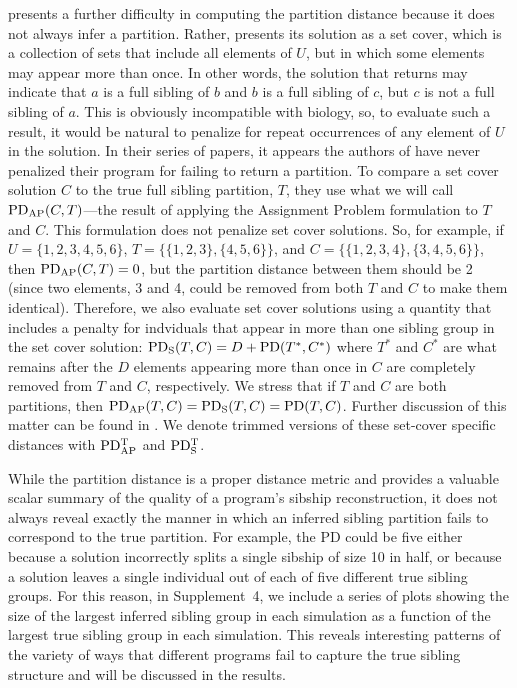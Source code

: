 \kinalyzer{} presents a further difficulty in computing the partition distance because it does not always 
infer a partition.  Rather, \kinalyzer{} presents its solution as a set cover, which is a collection of 
sets that include all elements of $U$, but in which some elements may appear more than once.  In other 
words, the solution that \kinalyzer{} returns may indicate that $a$ is a full sibling of $b$ and $b$ is a 
full sibling of $c$, but $c$ is not a full sibling of $a$.  This is obviously incompatible with
biology, so, to evaluate such a result, it would be natural to penalize for repeat 
occurrences of any element of $U$ in the solution.  In their series of papers, it appears 
the authors of \kinalyzer{} have never penalized their program for failing to return a partition.  To 
compare a set cover solution $C$ to the true full sibling partition, $T$, they use what we will call $
\mathrm{PD_{AP}}(C,T)$---the result of applying the Assignment Problem formulation to $T$ and $C$.     This 
formulation does not penalize set cover solutions.  So, for example, if  $U=\{1,2,3,4,5,6\}$,
$T=\{\{1,2,3\},\{4,5,6\}\}$, and $C=\{\{1,2,3,4\}, \{3,4,5,6\}\}$, then $\mathrm{PD_{AP}}(C,T)=0$, but the partition 
distance between them should be 2 (since two elements, 3 and 4, could be removed from both $T$ and $C$ 
to make them identical).    Therefore, we also evaluate set cover solutions using a quantity that 
includes a penalty for indviduals that appear in more than one sibling group in the set cover solution: 
$\mathrm{PD_S}(T,C)= D+\mathrm{PD}(T^*,C^*)$ where $T^*$ and $C^*$ are what remains after the $D$ elements appearing 
more than once in $C$ are completely removed from $T$ and $C$, respectively.  We stress that if $T$ and $C$ are both 
partitions, then $\mathrm{PD_{AP}}(T,C) = \mathrm{PD_S}(T,C)=\mathrm{PD}(T,C)$. 
Further discussion of this matter can be found in \citet{almudevar11}. 
We denote trimmed versions of these set-cover specific distances with $\mathrm{PD_{AP}^T}$ and $\mathrm{PD_S^T}$.

While the partition distance is a proper distance metric and provides a valuable scalar summary of the 
quality of a program's sibship reconstruction, it does not always reveal exactly the manner in which an 
inferred sibling  partition fails to correspond to the true partition.  For example, the PD could be 
five either because a solution incorrectly splits a single sibship of size 10 in half, or because a 
solution leaves a single individual out of each of five different true sibling groups.  For this 
reason, in Supplement~4, we include a series of plots showing the size of the largest inferred sibling 
group in each simulation as a function of the largest true sibling group in each simulation.  This 
reveals interesting patterns of the variety of ways that different programs fail to capture the true 
sibling structure and will be discussed in the results.

